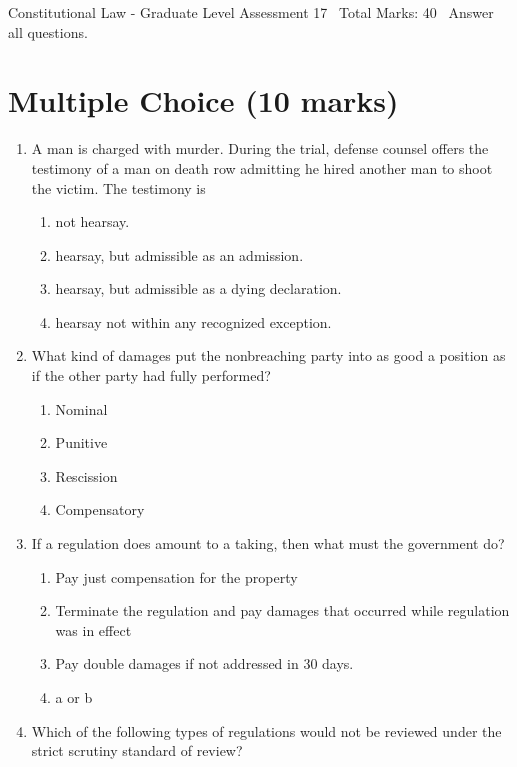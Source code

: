 \documentclass[12pt]{article}
\begin{document}
\begin{center}
Constitutional Law - Graduate Level Assessment 17 \
Total Marks: 40 \
Answer all questions.
\end{center}

\section*{Multiple Choice (10 marks)}
\begin{enumerate}[label=\arabic*.]
\item A man is charged with murder. During the trial, defense counsel offers the testimony of a man on death row admitting he hired another man to shoot the victim. The testimony is
\begin{enumerate}[label=(\alph*)]
    \item not hearsay.
    \item hearsay, but admissible as an admission.
    \item hearsay, but admissible as a dying declaration.
    \item hearsay not within any recognized exception.
\end{enumerate}
\item What kind of damages put the nonbreaching party into as good a position as if the other party had fully performed?
\begin{enumerate}[label=(\alph*)]
    \item Nominal
    \item Punitive
    \item Rescission
    \item Compensatory
\end{enumerate}
\item If a regulation does amount to a taking, then what must the government do?
\begin{enumerate}[label=(\alph*)]
    \item Pay just compensation for the property
    \item Terminate the regulation and pay damages that occurred while regulation was in effect
    \item Pay double damages if not addressed in 30 days.
    \item a or b
\end{enumerate}
\item Which of the following types of regulations would not be reviewed under the strict scrutiny standard of review?
\begin{enumerate}[label=(\alph*)]

\end{enumerate}
\end{enumerate}
\end{document}
